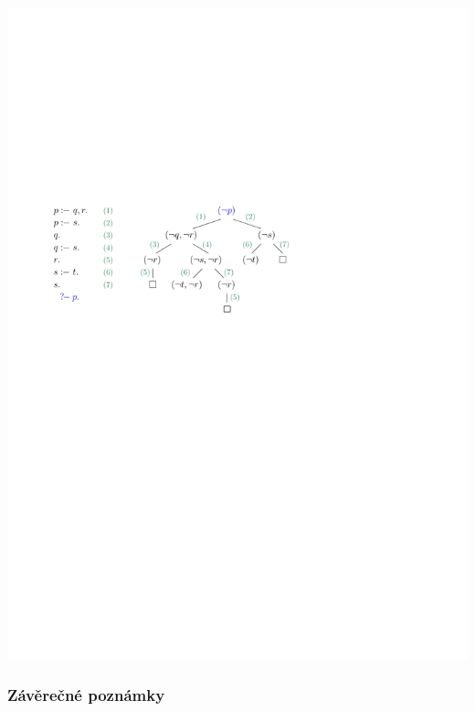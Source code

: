 \smallskip
\centerline{\includegraphics[scale=0.9]{files/rezoluceSLDstrom.pdf}}
\smallskip



\subsubsection*{Závěrečné poznámky}

